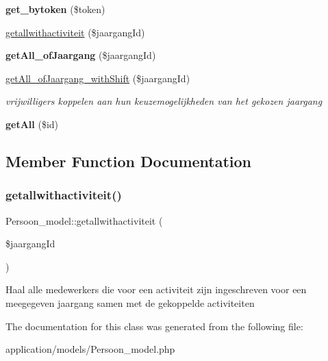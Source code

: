 \begin{DoxyCompactItemize}
\mbox{\label{class_persoon__model_a779aefc3d6ce88de6a5f5eb9be057883}} 
{\bfseries get\+\_\+bytoken} (\$token)
\item 
\mbox{\hyperlink{class_persoon__model_a72d8c06b34d07ca558ec53c759996b60}{getallwithactiviteit}} (\$jaargang\+Id)
\item 
\mbox{\label{class_persoon__model_ad60023155e1b4bf3279227284647bc2d}} 
{\bfseries get\+All\+\_\+of\+Jaargang} (\$jaargang\+Id)
\item 
\mbox{\label{class_persoon__model_abe2394803431cfb447887c36bba2b8eb}} 
\mbox{\hyperlink{class_persoon__model_abe2394803431cfb447887c36bba2b8eb}{get\+All\+\_\+of\+Jaargang\+\_\+with\+Shift}} (\$jaargang\+Id)
\begin{DoxyCompactList}\small\item\em vrijwilligers koppelen aan hun keuzemogelijkheden van het gekozen jaargang \end{DoxyCompactList}\item 
\mbox{\label{class_persoon__model_a8d8bc184bfa930d377f5c76969711501}} 
{\bfseries get\+All} (\$id)
\end{DoxyCompactItemize}


\subsection{Member Function Documentation}
\mbox{\label{class_persoon__model_a72d8c06b34d07ca558ec53c759996b60}} 
\subsubsection{\texorpdfstring{getallwithactiviteit()}{getallwithactiviteit()}}
{\footnotesize\ttfamily Persoon\+\_\+model\+::getallwithactiviteit (\begin{DoxyParamCaption}\item[{}]{\$jaargang\+Id }\end{DoxyParamCaption})}

Haal alle medewerkers die voor een activiteit zijn ingeschreven voor een meegegeven jaargang samen met de gekoppelde activiteiten 

The documentation for this class was generated from the following file\+:\begin{DoxyCompactItemize}
\item 
application/models/Persoon\+\_\+model.\+php\end{DoxyCompactItemize}
